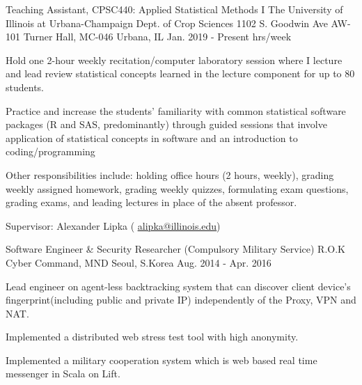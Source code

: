 \begin{cventries}
  \cventry
    {Teaching Assistant, CPSC440: Applied Statistical Methods I} %
    {The University of Illinois at Urbana-Champaign \newline Dept. of Crop Sciences } %
    {1102 S. Goodwin Ave \newline AW-101 Turner Hall, MC-046
    Urbana, IL} %
    {Jan. 2019 - Present  hrs/week} %
    {
      \begin{cvitems} %
        \item {Hold one 2-hour weekly recitation/computer laboratory session where I lecture and lead review statistical concepts learned in the lecture component for up to 80 students.}
        \item {Practice and increase the students’ familiarity with common statistical software packages (R and SAS, predominantly) through guided sessions that involve application of statistical concepts in software and an introduction to coding/programming}
        \item {Other responsibilities include: holding office hours (2 hours, weekly), grading weekly assigned homework, grading weekly quizzes, formulating exam questions, grading exams, and leading lectures in place of the absent professor.}
        \item {Supervisor: Alexander Lipka ( \textcolor{navyblue}{\underline{\href{mailto:alipka@illinois.edu}{alipka@illinois.edu}}})}
      \end{cvitems}
    }

  \cventry
    {Software Engineer \& Security Researcher (Compulsory Military Service)} %
    {R.O.K Cyber Command, MND} %
    {Seoul, S.Korea} %
    {Aug. 2014 - Apr. 2016} %
    {
      \begin{cvitems} %
        \item {Lead engineer on agent-less backtracking system that can discover client device's fingerprint(including public and private IP) independently of the Proxy, VPN and NAT.}
        \item {Implemented a distributed web stress test tool with high anonymity.}
        \item {Implemented a military cooperation system which is web based real time messenger in Scala on Lift.}
      \end{cvitems}
    }


\end{cventries}
